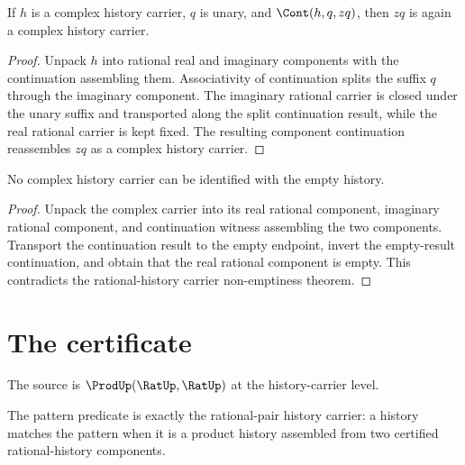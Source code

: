 \begin{theorem}
\label{thm:complex-history-carrier-unary-continuation-closed}
If \(h\) is a complex history carrier, \(q\) is unary, and
\(\Cont(h,q,zq)\), then \(zq\) is again a complex history carrier.
\end{theorem}
\begin{proof}
Unpack \(h\) into rational real and imaginary components with the continuation
assembling them. Associativity of continuation splits the suffix \(q\) through
the imaginary component. The imaginary rational carrier is closed under the
unary suffix and transported along the split continuation result, while the
real rational carrier is kept fixed. The resulting component continuation
reassembles \(zq\) as a complex history carrier.
\end{proof}

\begin{theorem}
\label{thm:complex-history-carrier-not-empty}
No complex history carrier can be identified with the empty history.
\end{theorem}
\begin{proof}
Unpack the complex carrier into its real rational component, imaginary rational
component, and continuation witness assembling the two components. Transport
the continuation result to the empty endpoint, invert the empty-result
continuation, and obtain that the real rational component is empty. This
contradicts the rational-history carrier non-emptiness theorem.
\end{proof}

\section{The certificate}

\begin{definition}
\label{def:complex-source-specification}
The source is \(\ProdUp(\RatUp,\RatUp)\) at the history-carrier level.
\end{definition}

\begin{definition}
\label{def:complex-pattern-specification}
The pattern predicate is exactly the rational-pair history carrier: a history
matches the pattern when it is a product history assembled from two certified
rational-history components.
\end{definition}

